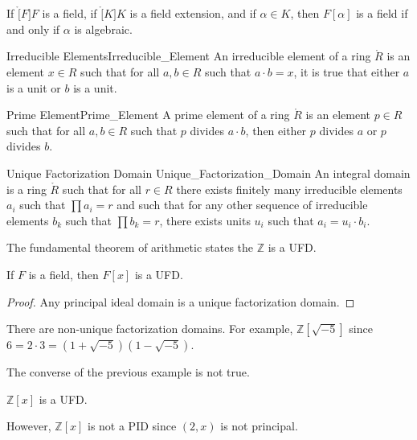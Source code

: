 \documentclass{article}                                                        %
\begin{document}
        \begin{theorem}
            If $\ring[F]{F}$ is a field, if $\ring[K]{K}$ is a field extension,
            and if $\alpha\in{K}$, then $F[\alpha]$ is a field if and only if
            $\alpha$ is algebraic. 
        \end{theorem}
        \begin{theorem}
        \end{theorem}
        \begin{fdefinition}{Irreducible Elements}{Irreducible_Element}
            An irreducible element of a ring $\ring{R}$ is an element
            $x\in{R}$ such that for all $a,b\in{R}$ such that $a\cdot{b}=x$, it
            is true that either $a$ is a unit or $b$ is a unit.
        \end{fdefinition}
        \begin{fdefinition}{Prime Element}{Prime_Element}
            A prime element of a ring $\ring{R}$ is an element $p\in{R}$
            such that for all $a,b\in{R}$ such that $p$ divides $a\cdot{b}$,
            then either $p$ divides $a$ or $p$ divides $b$.
        \end{fdefinition}
        \begin{fdefinition}{Unique Factorization Domain}
                           {Unique_Factorization_Domain}
            An integral domain is a ring $\ring{R}$ such that for all $r\in{R}$
            there exists finitely many irreducible elements $a_{i}$ such that
            $\prod{a}_{i}=r$ and such that for any other sequence of irreducible
            elements $b_{k}$ such that $\prod{b}_{k}=r$, there exists units
            $u_{i}$ such that $a_{i}=u_{i}\cdot{b}_{i}$.
        \end{fdefinition}
        \begin{example}
            The fundamental theorem of arithmetic states the $\mathbb{Z}$ is a
            UFD.
        \end{example}
        \begin{theorem}
            If $F$ is a field, then $F[x]$ is a UFD.
        \end{theorem}
        \begin{proof}
            Any principal ideal domain is a unique factorization domain.
        \end{proof}
        \begin{example}
            There are non-unique factorization domains. For example,
            $\mathbb{Z}[\sqrt{\minus{5}}]$ since
            $6=2\cdot{3}=(1+\sqrt{\minus{5}})(1-\sqrt{\minus{5}})$.
        \end{example}
        The converse of the previous example is not true.
        \begin{theorem}
            $\mathbb{Z}[x]$ is a UFD.
        \end{theorem}
        However, $\mathbb{Z}[x]$ is not a PID since $(2,x)$ is not principal.
\end{document}
